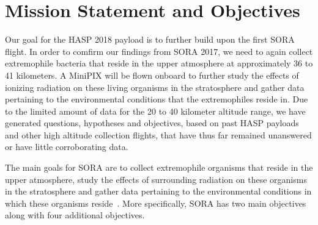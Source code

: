 \section{Mission Statement and Objectives}
\label{sec:Introduction}

Our goal for the HASP 2018 payload is to further build upon the first SORA~\cite{SORA} flight.  In order to comfirm our findings from SORA 2017, we need to again collect extremophile bacteria that reside in the upper atmosphere at approximately 36 to 41 kilometers.  A MiniPIX will be flown onboard to further study the effects of ionizing radiation on these living organisms in the stratosphere and gather data pertaining to the environmental conditions that the extremophiles reside in. Due to the limited amount of data for the 20 to 40 kilometer altitude range, we have generated questions, hypotheses and objectives, based on past HASP payloads and other high altitude collection flights, that have thus far remained unanswered or have little corroborating data.


The main goals for SORA are to collect extremophile organisms that reside in the upper atmosphere, study the effects of surrounding radiation on these organisms in the stratosphere and gather data pertaining to the environmental conditions in which these organisms reside~\cite{SORA}.  More specifically, SORA has two main objectives along with four additional objectives.\\

